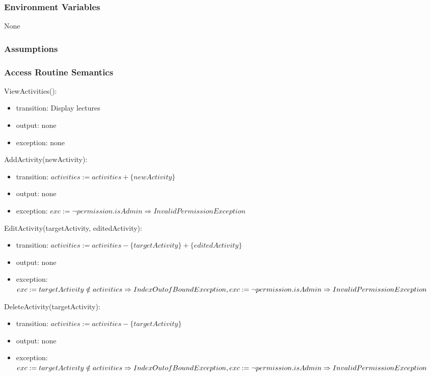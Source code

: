 \documentclass[12pt, titlepage]{article}
\begin{document}
\subsubsection{Environment Variables}

None

\subsubsection{Assumptions}

\subsubsection{Access Routine Semantics}

\noindent ViewActivities():
\begin{itemize}
\item transition: Display lectures
\item output: none
\item exception: none
\end{itemize}

\noindent AddActivity(newActivity):
\begin{itemize}
\item transition: $activities := activities + \{newActivity\}$
\item output: none
\item exception: $exc := \neg permission.isAdmin \Rightarrow InvalidPermission Exception$
\end{itemize}

\noindent EditActivity(targetActivity, editedActivity):
\begin{itemize}
\item transition: $activities := activities - \{targetActivity\} + \{editedActivity\}$
\item output: none
\item exception: $exc := targetActivity \notin activities \Rightarrow IndexOutofBound Exception,\\ 
                  exc := \neg permission.isAdmin \Rightarrow InvalidPermission Exception$
\end{itemize}

\noindent DeleteActivity(targetActivity):
\begin{itemize}
\item transition: $activities := activities - \{targetActivity\}$
\item output: none
\item exception: $exc := targetActivity \notin activities \Rightarrow IndexOutofBound Exception,\\
                  exc := \neg permission.isAdmin \Rightarrow InvalidPermission Exception$
\end{itemize}
\end{document}
